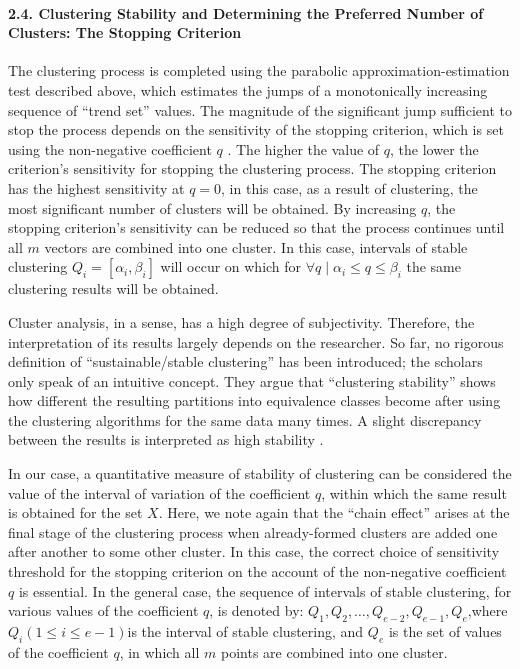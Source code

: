 \paragraph{2.4. Clustering Stability and Determining the Preferred Number of Clusters: The Stopping Criterion}

The clustering process is completed using the parabolic approximation-estimation test described above, which estimates the jumps of a monotonically increasing sequence of “trend set” values. The magnitude of the significant jump sufficient to stop the process depends on the sensitivity of the stopping criterion, which is set using the non-negative coefficient \(q\) \cite{Orekhov,Orekhov201811}. The higher the value of \(q\), the lower the criterion’s sensitivity for stopping the clustering process. The stopping criterion has the highest sensitivity at \(q = 0\), in this case, as a result of clustering, the most significant number of clusters will be obtained. By increasing \(q\), the stopping criterion’s sensitivity can be reduced so that the process continues until all \(m\) vectors are combined into one cluster. In this case, intervals of stable clustering \(Q_i = [\alpha_i, \beta_i]\) will occur on which for \(\forall q \mid \alpha_i \le q \le \beta_i\) the same clustering results will be obtained.

Cluster analysis, in a sense, has a high degree of subjectivity. Therefore, the interpretation of its results largely depends on the researcher. So far, no rigorous definition of “sustainable/stable clustering” has been introduced; the scholars only speak of an intuitive concept. They argue that “clustering stability” shows how different the resulting partitions into equivalence classes become after using the clustering algorithms for the same data many times. A slight discrepancy between the results is interpreted as high stability \cite{GranichinShalymovAvros}.

In our case, a quantitative measure of stability of clustering can be considered the value of the interval of variation of the coefficient \(q\), within which the same result is obtained for the set \(X\). Here, we note again that the “chain effect” arises at the final stage of the clustering process when already-formed clusters are added one after another to some other cluster. In this case, the correct choice of sensitivity threshold for the stopping criterion on the account of the non-negative coefficient \(q\) is essential. In the general case, the sequence of intervals of stable clustering, for various values of the coefficient \(q\), is denoted by: \(Q_1, Q_2,\ldots, Q_{e-2}, Q_{e-1}, Q_e\),where \(Q_i (1\le i \le e - 1)\)is the interval of stable clustering, and \(Q_e\) is the set of values of the coefficient \(q\), in which all \(m\) points are combined into one cluster.

